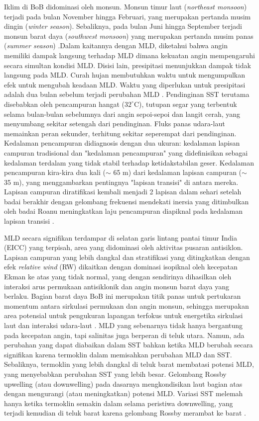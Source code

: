 \begin{spacing}{1.5}
	Iklim di BoB didominasi oleh monsun. Monsun timur laut (\textit{northeast monsoon}) terjadi pada bulan November hingga Februari, yang merupakan pertanda musim dingin (\textit{winter season}). Sebaliknya, pada bulan Juni hingga September terjadi monsun barat daya (\textit{southwest monsoon}) yang merupakan pertanda musim panas (\textit{summer season}) .Dalam kaitannya dengan MLD, diketahui bahwa angin memiliki dampak langsung terhadap MLD dimana kekuatan angin mempengaruhi secara simultan kondisi MLD. Disisi lain, presipitasi menunjukkan dampak tidak langsung pada MLD. Curah hujan membutuhkan waktu untuk mengumpulkan efek untuk mengubah keadaan MLD. Waktu yang diperlukan untuk presipitasi adalah dua bulan sebelum terjadi perubahan MLD . Pendinginan SST terutama disebabkan oleh pencampuran hangat ($32^\circ$C), tutupan segar yang terbentuk selama bulan-bulan sebelumnya dari angin sepoi-sepoi dan langit cerah, yang menyumbang sekitar setengah dari pendinginan. Fluks panas udara-laut memainkan peran sekunder, terhitung sekitar seperempat dari pendinginan. Kedalaman pencampuran didiagnosis dengan dua ukuran: kedalaman lapisan campuran tradisional dan "kedalaman pencampuran" yang didefinisikan sebagai kedalaman terdalam yang tidak stabil terhadap ketidakstabilan geser. Kedalaman pencampuran kira-kira dua kali ($\sim$ 65 m) dari kedalaman lapisan campuran ($\sim$ 35 m), yang menggambarkan pentingnya "lapisan transisi" di antara mereka. Lapisan campuran diratifikasi kembali menjadi 2 lapisan dalam sehari setelah badai berakhir dengan gelombang frekuensi mendekati inersia yang ditimbulkan oleh badai Roanu meningkatkan laju pencampuran diapiknal pada kedalaman lapisan transisi . 
	
	MLD secara signifikan terdampar di selatan garis lintang pantai timur India (EICC) yang terpisah, area yang didominasi oleh aktivitas pusaran antisiklon. Lapisan campuran yang lebih dangkal dan stratifikasi yang ditingkatkan dengan efek \textit{relative wind} (RW) dikaitkan dengan dominasi isopiknal oleh kecepatan Ekman ke atas yang tidak normal, yang dengan sendirinya dihasilkan oleh interaksi arus permukaan antisiklonik dan angin monsun barat daya yang berlaku. Bagian barat daya BoB ini merupakan titik panas untuk pertukaran momentum antara sirkulasi permukaan dan angin monsun, sehingga merupakan area potensial untuk pengukuran lapangan terfokus untuk energetika sirkulasi laut dan interaksi udara-laut . MLD yang sebenarnya tidak hanya bergantung pada kecepatan angin, tapi salinitas juga berperan di teluk utara. Namun, ada perubahan yang dapat diabaikan dalam SST bahkan ketika MLD berubah secara signifikan karena termoklin dalam memisahkan perubahan MLD dan SST. Sebaliknya, termoklin yang lebih dangkal di teluk barat membatasi potensi MLD, yang menyebabkan perubahan SST yang lebih besar. Gelombang Rossby upwelling (atau downwelling) pada dasarnya mengkondisikan laut bagian atas dengan mengurangi (atau meningkatkan) potensi MLD. Variasi SST melemah hanya ketika termoklin semakin dalam selama peristiwa downwelling, yang terjadi kemudian di teluk barat karena gelombang Rossby merambat ke barat . 
	

\end{spacing}
